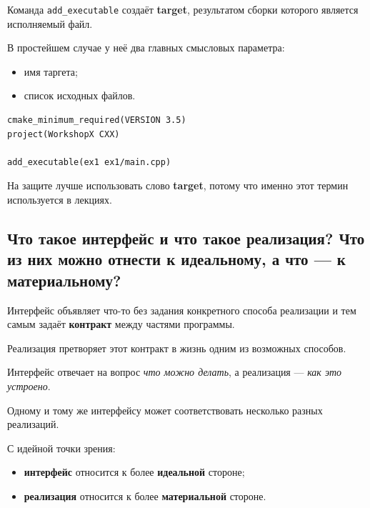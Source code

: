 \begin{definition}
Команда \texttt{add\_executable} создаёт \textbf{target}, результатом сборки которого является исполняемый файл.
\end{definition}

В простейшем случае у неё два главных смысловых параметра:
\begin{itemize}
    \item имя таргета;
    \item список исходных файлов.
\end{itemize}

\begin{example}
\begin{verbatim}
cmake_minimum_required(VERSION 3.5)
project(WorkshopX CXX)

add_executable(ex1 ex1/main.cpp)
\end{verbatim}
\end{example}

\begin{remark}
На защите лучше использовать слово \textbf{target}, потому что именно этот термин используется в лекциях.
\end{remark}


\subsection{Что такое интерфейс и что такое реализация? Что из них можно отнести к идеальному, а что --- к материальному?}

\begin{definition}[Интерфейс]
Интерфейс объявляет что-то без задания конкретного способа реализации и тем самым задаёт \textbf{контракт} между частями программы.
\end{definition}

\begin{definition}[Реализация]
Реализация претворяет этот контракт в жизнь одним из возможных способов.
\end{definition}

Интерфейс отвечает на вопрос \emph{что можно делать}, а реализация --- \emph{как это устроено}.

Одному и тому же интерфейсу может соответствовать несколько разных реализаций.

С идейной точки зрения:
\begin{itemize}
    \item \textbf{интерфейс} относится к более \textbf{идеальной} стороне;
    \item \textbf{реализация} относится к более \textbf{материальной} стороне.
\end{itemize}


